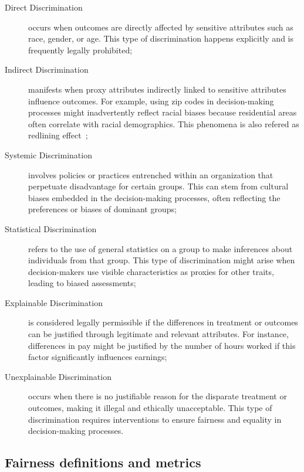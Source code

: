 \begin{description}
    \item[Direct Discrimination] occurs when outcomes are directly affected by sensitive attributes such as race, gender, or age. This type of discrimination happens explicitly and is frequently legally prohibited;
    
    \item[Indirect Discrimination] manifests when proxy attributes indirectly linked to sensitive attributes influence outcomes. For example, using zip codes in decision-making processes might inadvertently reflect racial biases because residential areas often correlate with racial demographics. This phenomena is also refered as redlining effect~\citep{Pedreschi2008};
    
    \item[Systemic Discrimination] involves policies or practices entrenched within an organization that perpetuate disadvantage for certain groups. This can stem from cultural biases embedded in the decision-making processes, often reflecting the preferences or biases of dominant groups;
    
    \item[Statistical Discrimination] refers to the use of general statistics on a group to make inferences about individuals from that group. This type of discrimination might arise when decision-makers use visible characteristics as proxies for other traits, leading to biased assessments;
    
    \item[Explainable Discrimination] is considered legally permissible if the differences in treatment or outcomes can be justified through legitimate and relevant attributes. For instance, differences in pay might be justified by the number of hours worked if this factor significantly influences earnings;
    
    \item[Unexplainable Discrimination] occurs when there is no justifiable reason for the disparate treatment or outcomes, making it illegal and ethically unacceptable. This type of discrimination requires interventions to ensure fairness and equality in decision-making processes.
\end{description}


\subsection{Fairness definitions and metrics}

